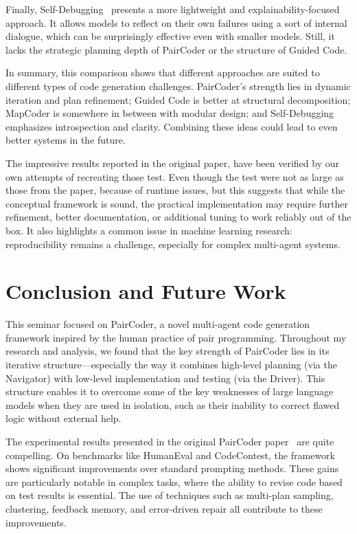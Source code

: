 \documentclass[11pt,a4paper]{article}
\begin{document}
Finally, Self-Debugging~\cite{chen2024selfdebugging} presents a more lightweight and explainability-focused approach. It allows models to reflect on their own failures using a sort of internal dialogue, which can be surprisingly effective even with smaller models. Still, it lacks the strategic planning depth of PairCoder or the structure of Guided Code.

In summary, this comparison shows that different approaches are suited to different types of code generation challenges. PairCoder’s strength lies in dynamic iteration and plan refinement; Guided Code is better at structural decomposition; MapCoder is somewhere in between with modular design; and Self-Debugging emphasizes introspection and clarity. Combining these ideas could lead to even better systems in the future.

The impressive results reported in the original paper, have been verified by our own attempts of recreating those test. Even though the test were not as large as those from the paper, because of runtime issues, but this suggests that while the conceptual framework is sound, the practical implementation may require further refinement, better documentation, or additional tuning to work reliably out of the box. It also highlights a common issue in machine learning research: reproducibility remains a challenge, especially for complex multi-agent systems.


\section{Conclusion and Future Work}

This seminar focused on PairCoder, a novel multi-agent code generation framework inspired by the human practice of pair programming. Throughout my research and analysis, we found that the key strength of PairCoder lies in its iterative structure—especially the way it combines high-level planning (via the Navigator) with low-level implementation and testing (via the Driver). This structure enables it to overcome some of the key weaknesses of large language models when they are used in isolation, such as their inability to correct flawed logic without external help.

The experimental results presented in the original PairCoder paper~\cite{zhang2024paircoder} are quite compelling. On benchmarks like HumanEval and CodeContest, the framework shows significant improvements over standard prompting methods. These gains are particularly notable in complex tasks, where the ability to revise code based on test results is essential. The use of techniques such as multi-plan sampling, clustering, feedback memory, and error-driven repair all contribute to these improvements.
\end{document}
